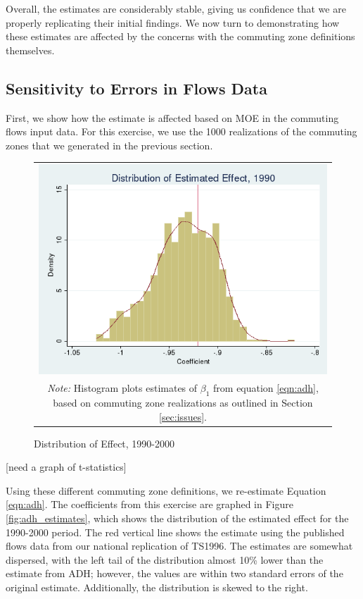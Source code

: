 

Overall, the estimates are considerably stable, giving us confidence that we are properly replicating their initial findings. We now turn to demonstrating how these estimates are affected by the concerns with the commuting zone definitions themselves.

\subsection{Sensitivity to Errors in Flows Data}

First, we show how the estimate is affected based on MOE in the commuting flows input data. For this exercise, we use the 1000 realizations of the commuting zones that we generated in the previous section.

\begin{figure}\centering
\caption{Distribution of Effect, 1990-2000 \label{fig:1990dist}}
\begin{tabular}{c}
\includegraphics[scale=.3]{./figures/1990_distribution.png}\\
\multicolumn{1}{p{4.5in}}{\footnotesize \emph{Note:} Histogram plots estimates of $\beta_1$ from equation \ref{eqn:adh}, based on commuting zone realizations as outlined in Section \ref{sec:issues}.}
\end{tabular}
\end{figure}

[need a graph of t-statistics]

Using these different commuting zone definitions, we re-estimate Equation \ref{eqn:adh}. The coefficients from this exercise are graphed in Figure \ref{fig:adh_estimates}, which shows the distribution of the estimated effect for the 1990-2000 period. The red vertical line shows the estimate using the published flows data from our national replication of TS1996. The estimates are somewhat dispersed, with the left tail of the distribution almost 10\% lower than the estimate from ADH; however, the values are within two standard errors of the original estimate. Additionally, the distribution is skewed to the right.

